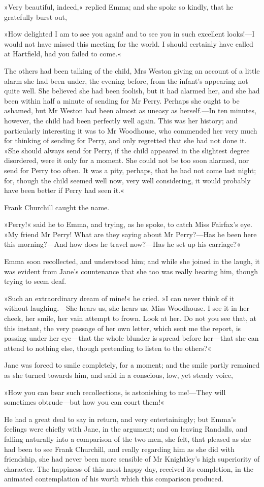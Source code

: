 »Very beautiful, indeed,« replied Emma; and she spoke so kindly, that he gratefully burst out,

»How delighted I am to see you again! and to see you in such excellent looks!—I would not have missed this meeting for the world. I should certainly have called at Hartfield, had you failed to come.«

The others had been talking of the child, Mrs Weston giving an account of a little alarm she had been under, the evening before, from the infant's appearing not quite well. She believed she had been foolish, but it had alarmed her, and she had been within half a minute of sending for Mr Perry. Perhaps she ought to be ashamed, but Mr Weston had been almost as uneasy as herself.—In ten minutes, however, the child had been perfectly well again. This was her history; and particularly interesting it was to Mr Woodhouse, who commended her very much for thinking of sending for Perry, and only regretted that she had not done it. »She should always send for Perry, if the child appeared in the slightest degree disordered, were it only for a moment. She could not be too soon alarmed, nor send for Perry too often. It was a pity, perhaps, that he had not come last night; for, though the child seemed well now, very well considering, it would probably have been better if Perry had seen it.«

Frank Churchill caught the name.

»Perry!« said he to Emma, and trying, as he spoke, to catch Miss Fairfax's eye. »My friend Mr Perry! What are they saying about Mr Perry?—Has he been here this morning?—And how does he travel now?—Has he set up his carriage?«

Emma soon recollected, and understood him; and while she joined in the laugh, it was evident from Jane's countenance that she too was really hearing him, though trying to seem deaf.

»Such an extraordinary dream of mine!« he cried. »I can never think of it without laughing.—She hears us, she hears us, Miss Woodhouse. I see it in her cheek, her smile, her vain attempt to frown. Look at her. Do not you see that, at this instant, the very passage of her own letter, which sent me the report, is passing under her eye—that the whole blunder is spread before her—that she can attend to nothing else, though pretending to listen to the others?«

Jane was forced to smile completely, for a moment; and the smile partly remained as she turned towards him, and said in a conscious, low, yet steady voice,

»How you can bear such recollections, is astonishing to me!—They will sometimes obtrude—but how you can court them!«

He had a great deal to say in return, and very entertainingly; but Emma's feelings were chiefly with Jane, in the argument; and on leaving Randalls, and falling naturally into a comparison of the two men, she felt, that pleased as she had been to see Frank Churchill, and really regarding him as she did with friendship, she had never been more sensible of Mr Knightley's high superiority of character. The happiness of this most happy day, received its completion, in the animated contemplation of his worth which this comparison produced.